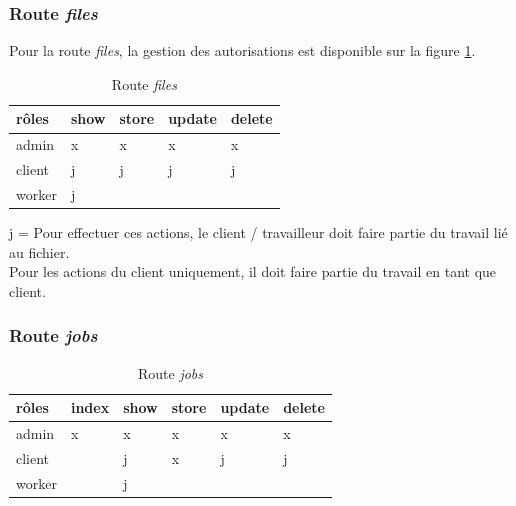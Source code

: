 \documentclass[
    iai, %
    il, %
]{heig-tb}
\begin{document}
\subsubsection{Route \emph{files}}
Pour la route \emph{files}, la gestion des autorisations est disponible sur la figure \ref{autorisations-route-files}.

\begin{table}[h]
    \begin{center}
        \caption{Route \emph{files} \label{autorisations-route-files}}
        \begin{tabularx}{1.0\textwidth} {X|X|X|X|X}
            rôles  & show & store & update & delete \\ \hline
            admin  & x    & x     & x      & x      \\
            client & j    & j     & j      & j      \\
            worker & j    &       &        &        \\
        \end{tabularx}
    \end{center}
\end{table}

j = Pour effectuer ces actions, le client / travailleur doit faire partie du travail lié au fichier. \\
Pour les actions du client uniquement, il doit faire partie du travail en tant que client.

\subsubsection{Route \emph{jobs}}


\begin{table}[h]
    \begin{center}
        \caption{Route \emph{jobs} \label{autorisations-route-jobs}}
        \begin{tabularx}{1.0\textwidth} {X|X|X|X|X|X}
            rôles  & index & show & store & update & delete \\ \hline
            admin  & x     & x    & x     & x      & x      \\
            client &       & j    & x     & j      & j      \\
            worker &       & j    &       &        &        \\
        \end{tabularx}
    \end{center}
\end{table}
\end{document}
